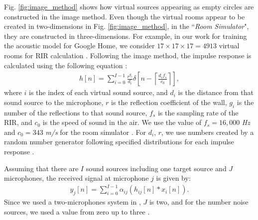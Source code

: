 \documentclass{article}
\begin{document}
Fig. \ref{fig:image_method} shows how virtual sources
appearing as empty circles are constructed in the image method.
Even though the virtual rooms appear to be created in two-dimensions
in Fig. \ref{fig:image_method}, in the ``\emph{Room Simulator}",
they are constructed in three-dimensions. For example, in our
work for training the acoustic model for Google Home, we consider
$17 \times 17 \times 17 = 4913$ virtual rooms for RIR calculation
\cite{C_Kim_INTERSPEECH_2017_1}.
Following the image method, the impulse response is calculated
using the following equation
\cite{ J_Allen_JASA_1979, E_A_Lehmann_ASPAA_2007}:
\begin{align}
    h[n] = \sum_{i = 0}^{I-1} \frac{r^{g_i}}{d_i}
    \delta \left[n -\left \lceil{\frac{d_i f_s}{c_0}}\right \rceil \right],
      \label{eq:h_n_calculation}
\end{align}
where $i$ is the index of each virtual sound source, and $d_i$ is the distance
from that sound source to the microphone, $r$ is
the reflection coefficient of the wall, $g_i$ is
the number of the reflections
to that sound source, $f_s$ is the sampling rate of the RIR, and $c_0$ is the
speed of sound in the air. We use the value of $f_s = 16,000$ \textit{Hz} and
$c_0 = 343$ \textit{m/s} for the room simulator \cite{B_Li_INTERSPEECH_2017_1}.
For $d_i$, $r$, we use numbers created by a random number generator
following specified distributions for each impulse response \cite{C_Kim_INTERSPEECH_2017_1}.

Assuming that there are $I$ sound sources including one target
source and $J$ microphones, the received signal at microphone
$j$ is given by:
\begin{align}
  y_j[n] =  \sum_{i=0}^{I-1} \alpha_{ij} \left(h_{ij}[n] * x_i[n]\right).
  \label{eq:y_j_def}
\end{align}
Since we used a two-microphones system in
\cite{B_Li_INTERSPEECH_2017_1, C_Kim_INTERSPEECH_2017_1},
$J$ is two, and for the number noise sources, we used a value from zero
up to three \cite{C_Kim_INTERSPEECH_2017_1}.
%
%
%
%
%
%
%
%
%
%
\end{document}
